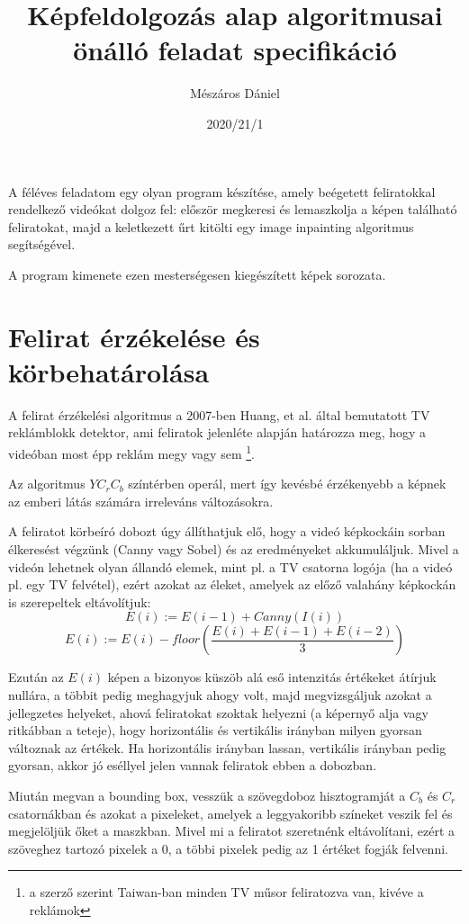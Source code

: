 \documentclass[11pt]{article}
\begin{document}
\title{Képfeldolgozás alap algoritmusai önálló feladat specifikáció}
\author{Mészáros Dániel}
\date{2020/21/1}
\maketitle

A féléves feladatom egy olyan program készítése, amely beégetett feliratokkal
rendelkező videókat dolgoz fel: először megkeresi és lemaszkolja a képen
található feliratokat, majd a keletkezett űrt kitölti egy image inpainting
algoritmus segítségével.

A program kimenete ezen mesterségesen kiegészített képek sorozata.

\section{Felirat érzékelése és körbehatárolása}
A felirat érzékelési algoritmus a 2007-ben Huang, et al.
\cite{huang2007intelligent} által bemutatott TV reklámblokk detektor, ami
feliratok jelenléte alapján határozza meg, hogy a videóban most épp reklám megy
vagy sem \footnote{a szerző szerint Taiwan-ban minden TV műsor feliratozva van,
kivéve a reklámok}.

Az algoritmus $Y C_r C_b$ színtérben operál, mert így kevésbé érzékenyebb a
képnek az emberi látás számára irreleváns változásokra.

A feliratot körbeíró dobozt úgy állíthatjuk elő, hogy a videó képkockáin sorban
élkeresést végzünk (Canny vagy Sobel) és az eredményeket akkumuláljuk.
Mivel a videón lehetnek olyan állandó elemek, mint pl. a TV csatorna logója
(ha a videó pl. egy TV felvétel),
ezért azokat az éleket, amelyek az előző valahány képkockán is szerepeltek eltávolítjuk:
\[
    E(i) := E(i - 1) + Canny(I(i))
\]
\[
    E(i) := E(i) - floor( \frac{E(i) + E(i - 1) + E(i - 2)}{3})
\]

Ezután az $E(i)$ képen a bizonyos küszöb alá eső intenzitás értékeket átírjuk nullára,
a többit pedig meghagyjuk ahogy volt, majd megvizsgáljuk azokat a jellegzetes helyeket,
ahová feliratokat szoktak helyezni (a képernyő alja vagy ritkábban a teteje), hogy
horizontális és vertikális irányban milyen gyorsan változnak az értékek.
Ha horizontális irányban lassan, vertikális irányban pedig gyorsan, akkor
jó eséllyel jelen vannak feliratok ebben a dobozban.

Miután megvan a bounding box, vesszük a szövegdoboz hisztogramját a $C_b$ és $C_r$
csatornákban és azokat a pixeleket, amelyek a leggyakoribb színeket veszik fel
és megjelöljük őket a maszkban.
Mivel mi a feliratot szeretnénk eltávolítani, ezért a szöveghez tartozó
pixelek a 0, a többi pixelek pedig az 1 értéket fogják felvenni.
\cite{huang2007intelligent}
\end{document}
